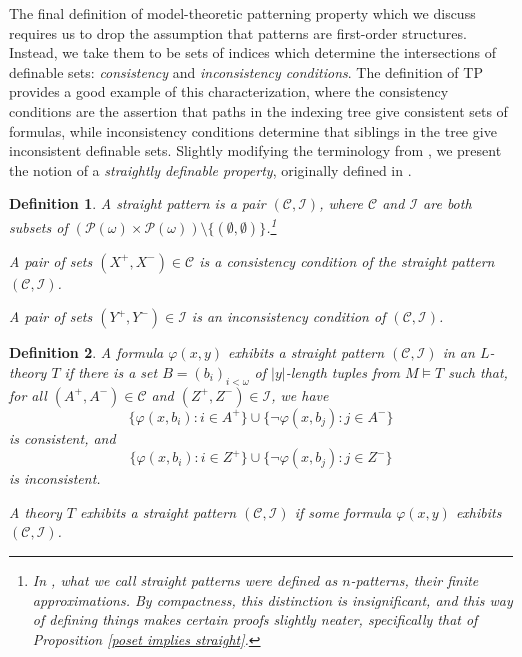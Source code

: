 \documentclass[10pt,a4paper]{amsart}
\newcommand{\calP}{\mathcal{P}}
\newcommand{\calC}{\mathcal{C}}
\newcommand{\calI}{\mathcal{I}}
\newcommand{\vphi}{\varphi}
\newtheorem{definition}{Definition}
\begin{document}
The final  definition of model-theoretic patterning property which we discuss requires us to drop the assumption that patterns are first-order structures. Instead, we take them to be sets of indices which determine the intersections of definable sets: \textit{consistency} and \textit{inconsistency conditions}. The definition of TP provides a good example of this characterization, where the consistency conditions are the assertion that paths in the indexing tree give consistent sets of formulas, while inconsistency conditions determine that siblings in the tree give inconsistent definable sets. Slightly modifying the terminology from \cite{bailetti2024walk}, we present the notion of a \textit{straightly definable property}, originally defined in \cite{shelah_what_2000}. %

\begin{definition}\label{straight pattern definition}
     A \textit{straight pattern} is a pair $(\calC,\calI)$, where $\calC$ and $\calI$ are both subsets of $(\calP(\omega)\times\calP(\omega))\setminus\{(\emptyset,\emptyset)\}$.\footnote{In \cite{bailetti2024walk}, what we call straight patterns were defined as $n$-patterns, their finite approximations. By compactness, this distinction is insignificant, and this way of defining things makes certain proofs slightly neater, specifically that of Proposition \ref{poset implies straight}.}

    A pair of sets $(X^+,X^-)\in \calC$ is a \textit{consistency condition} of the straight pattern $(\calC,\calI)$. 
    
    A pair of sets $(Y^+,Y^-)\in \calI$ is an \textit{inconsistency condition} of $(\calC,\calI)$.
    \end{definition}

\begin{definition}\label{exhibiting a straight pattern}
    A formula $\vphi(x,y)$ \textit{exhibits} a straight pattern $(\calC,\calI)$ in an $L$-theory $T$ if there is a set $B=(b_i)_{i<\omega}$ of $|y|$-length tuples from $M\models T$ such that, for all $(A^+,A^-)\in \calC$ and $(Z^+,Z^-)\in \calI$, we have 
    \[\{\vphi(x,b_i)\colon i\in A^+\}\cup \{\neg\vphi(x,b_j)\colon j\in A^-\}\] is consistent, and \[\{\vphi(x,b_i)\colon i\in Z^+\}\cup \{\neg\vphi(x,b_j)\colon j\in Z^-\}\] is inconsistent.

    A theory $T$ \textit{exhibits} a straight pattern $(\mathcal{C}, \mathcal{I})$ if some formula $\varphi(x, y)$ exhibits $(\mathcal{C}, \mathcal{I})$.
\end{definition}
\end{document}
